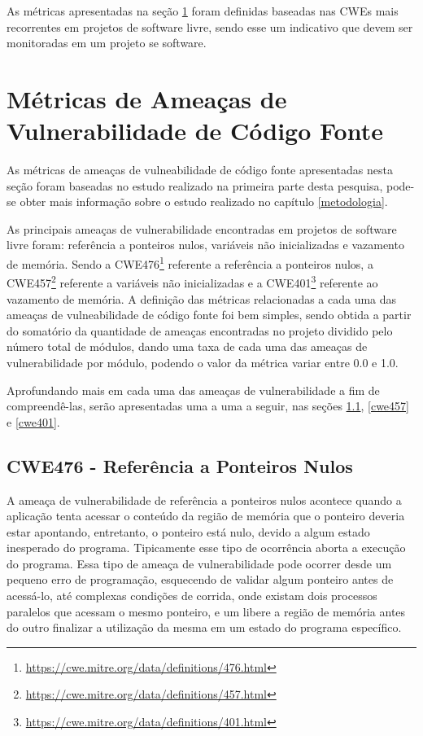 As métricas apresentadas na seção \ref{metricasvulnerabilidade} foram definidas
baseadas nas CWEs mais recorrentes em projetos de software livre, sendo esse um
indicativo que devem ser monitoradas em um projeto se software.

\section{Métricas de Ameaças de Vulnerabilidade de Código Fonte}\label{metricasvulnerabilidade}

As métricas de ameaças de vulneabilidade de código fonte apresentadas nesta
seção foram baseadas no estudo realizado na primeira parte desta pesquisa,
pode-se obter mais informação sobre o estudo realizado no capítulo
\ref{metodologia}.

As principais ameaças de vulnerabilidade encontradas em projetos de software
livre foram: referência a ponteiros nulos, variáveis não inicializadas e
vazamento de memória. Sendo a
CWE476\footnote{\url{https://cwe.mitre.org/data/definitions/476.html}} referente
a referência a ponteiros nulos, a
CWE457\footnote{\url{https://cwe.mitre.org/data/definitions/457.html}} referente
a variáveis não inicializadas e a
CWE401\footnote{\url{https://cwe.mitre.org/data/definitions/401.html}} referente
ao vazamento de memória. A definição das métricas relacionadas a cada uma das
ameaças de vulneabilidade de código fonte foi bem simples, sendo obtida a partir
do somatório da quantidade de ameaças encontradas no projeto dividido pelo
número total de módulos, dando uma taxa de cada uma das ameaças de
vulnerabilidade por módulo, podendo o valor da métrica variar entre 0.0 e 1.0.

Aprofundando mais em cada uma das ameaças de vulnerabilidade a fim de
compreendê-las, serão apresentadas uma a uma a seguir, nas seções \ref{cwe476},
\ref{cwe457} e \ref{cwe401}.

\subsection{CWE476 - Referência a Ponteiros Nulos}\label{cwe476}

A ameaça de vulnerabilidade de referência a ponteiros nulos acontece quando
a aplicação tenta acessar o conteúdo da região de memória que o ponteiro deveria estar
apontando, entretanto, o ponteiro está nulo, devido a algum estado inesperado do
programa. Tipicamente esse tipo de ocorrência aborta a execução do programa.
Essa tipo de ameaça de vulnerabilidade pode ocorrer desde um pequeno erro de
programação, esquecendo de validar algum ponteiro antes de acessá-lo, até
complexas condições de corrida, onde existam dois processos paralelos que acessam o mesmo
ponteiro, e um libere a região de memória antes do outro finalizar a utilização
da mesma em um estado do programa específico. 

